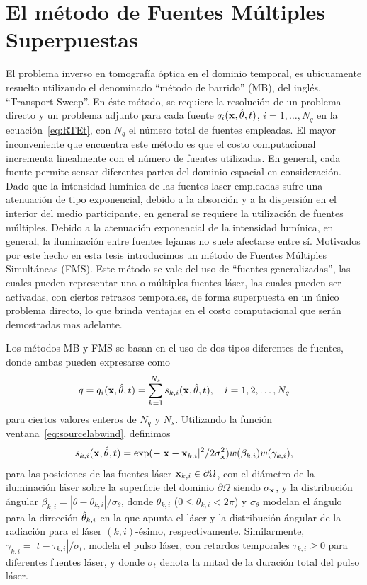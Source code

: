 \section{El método de Fuentes Múltiples Superpuestas}
\label{sec:FMS}
El problema inverso en tomografía óptica en el dominio temporal, es ubicuamente resuelto utilizando el denominado ``método de barrido'' (MB), del inglés, ``Transport Sweep''. En éste método, se requiere la resolución de un problema directo y un problema adjunto 
para cada fuente $q_i(\mathbf{x},\hat{\theta},t)$, $i=1,\ldots,N_q$ en la ecuación~\eqref{eq:RTEt}, 
con $N_q$ el número total de fuentes empleadas. 
El mayor inconveniente que encuentra este método es que el costo computacional 
incrementa linealmente con el número de fuentes utilizadas. En general, 
cada fuente permite sensar diferentes partes del dominio espacial en consideración. 
Dado que la intensidad lumínica de las fuentes laser empleadas sufre una 
atenuación de tipo exponencial, debido a la absorción y a la dispersión 
en el interior del medio participante, en general se requiere la utilización de 
fuentes múltiples. Debido a la atenuación exponencial de la intensidad lumínica, 
en general, la iluminación entre fuentes lejanas no suele afectarse entre sí. 
Motivados por este hecho en esta tesis introducimos un método de Fuentes Múltiples 
Simultáneas (FMS). Este método se vale del uso de ``fuentes generalizadas'', 
las cuales pueden representar una o múltiples fuentes láser, las cuales 
pueden ser activadas, con ciertos retrasos temporales, de forma superpuesta 
en un único problema directo, lo que brinda ventajas en el costo computacional 
que serán demostradas mas adelante.  

Los métodos MB y FMS se basan en el uso de dos tipos diferentes de fuentes, 
donde ambas pueden expresarse como
\begin{equation}
  q = q_i(\mathbf{x},\hat{\theta},t) =\sum_{k=1}^{N_s} s_{k,i}(\mathbf{x},\hat{\theta},t) ,\quad i=1,2,\ldots,N_q
\label{eq:RTEsources}
\end{equation}
para ciertos valores enteros de $N_q$ y $N_s$. Utilizando la 
función ventana~\eqref{eq:sourcelabwind}, definimos
\begin{equation}
  s_{k,i}(\mathbf{x},\hat{\theta},t) = \exp(-|\mathbf{x}-\mathbf{x}_{k,i}|^2/
  2\sigma_{\mathbf{x}}^2)w(\beta_{k,i})w(\gamma_{k,i}),
\label{eq:RTEsources2}
\end{equation}
para las posiciones de las fuentes láser $\mathbf{x}_{k,i}\in\partial\Omega$, 
con el diámetro de la iluminación láser sobre la superficie del dominio $\partial \Omega$ 
siendo $\sigma_{\mathbf{x}}$, y la distribución 
ángular $\beta_{k,i}=|\theta-\theta_{k,i}|/\sigma_{\theta}$, 
donde $\theta_{k,i}$ ($0\leq \theta_{k,i} < 2\pi$) y $\sigma_{\theta}$
modelan el ángulo para la dirección $\hat{\theta}_{k,i}$ en la que apunta el láser 
y la distribución ángular de la radiación para el láser $(k,i)$-ésimo, respectivamente. 
Similarmente, $\gamma_{k,i}=|t-\tau_{k,i}|/\sigma_t$, modela el pulso 
láser, con retardos temporales $\tau_{k,i}\geq 0$ para diferentes fuentes láser, 
y donde $\sigma_t$ denota la mitad de la duración total del pulso láser. 

